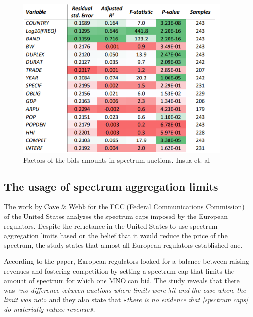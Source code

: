 
\begin{figure}[H]
	\begin{Center}
		\includegraphics[width=0.95\textwidth]{./media/image6.png}
		\caption{Factors of the bids amounts in spectrum auctions. Insua et. al\cite{1-30}}
	\end{Center}
\end{figure}



\subsection*{The usage of spectrum aggregation limits}
The work by Cave $\&$  Webb \cite{1-31} for the FCC (Federal Communications Commission) of the United States analyzes the spectrum caps imposed by the European regulators. Despite the reluctance in the United States to use spectrum-aggregation limits based on the belief that it would reduce the price of the spectrum, the study states that almost all European regulators established one.\par

According to the paper, European regulators looked for a balance between raising revenues and fostering competition by setting a spectrum cap that limits the amount of spectrum for which one MNO can bid. The study reveals that there was \textit{«no difference between auctions where limits were hit and the case where the limit was not»} and they also state that «\textit{there is no evidence that [spectrum caps] do materially reduce revenue».}\par

